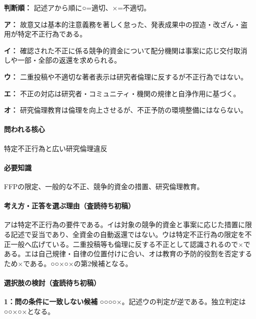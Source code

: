 \noindent\textbf{判断順：} 記述アから順に○=適切、×=不適切。\par

\noindent\textbf{ア：} 故意又は基本的注意義務を著しく怠った、発表成果中の捏造・改ざん・盗用が特定不正行為である。\par

\noindent\textbf{イ：} 確認された不正に係る競争的資金について配分機関は事案に応じ交付取消しや一部・全部の返還を求められる。\par

\noindent\textbf{ウ：} 二重投稿や不適切な著者表示は研究者倫理に反するが不正行為ではない。\par

\noindent\textbf{エ：} 不正の対応は研究者・コミュニティ・機関の規律と自浄作用に基づく。\par

\noindent\textbf{オ：} 研究倫理教育は倫理を向上させるが、不正予防の環境整備にはならない。\par

\paragraph{問われる核心} 特定不正行為と広い研究倫理違反

\paragraph{必要知識} FFPの限定、一般的な不正、競争的資金の措置、研究倫理教育。

\paragraph{考え方・正答を選ぶ理由（査読待ち初稿）} アは特定不正行為の要件である。イは対象の競争的資金と事案に応じた措置に限る記述で妥当であり、全資金の自動返還ではない。ウは特定不正行為の限定を不正一般へ広げている。二重投稿等も倫理に反する不正として認識されるので×である。エは自己規律・自律の位置付けに合い、オは教育の予防的役割を否定するため×である。○○×○×の第2候補となる。

\paragraph{選択肢の検討（査読待ち初稿）}\mbox{}\par

\noindent\textbf{1：問の条件に一致しない候補} ○○○○×。記述ウの判定が逆である。独立判定は○○×○×となる。\par

